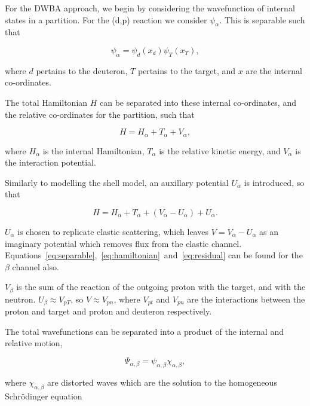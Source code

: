For the DWBA approach, we begin by considering the wavefunction of internal states in a partition. For the (d,p) reaction we consider $\psi_\alpha$. This is separable such that

\begin{equation} \label{eq:separable}
\psi_\alpha = \psi_d(x_d) \psi_T(x_T)\mathrm{,}
\end{equation}

where $d$ pertains to the deuteron, $T$ pertains to the target, and $x$ are the internal co-ordinates.

The total Hamiltonian $H$ can be separated into these internal co-ordinates, and the relative co-ordinates for the partition, such that

\begin{equation} \label{eq:hamiltonian}
H = H_\alpha + T_\alpha + V_\alpha\mathrm{,}
\end{equation}

where $H_\alpha$ is the internal Hamiltonian, $T_\alpha$ is the relative kinetic energy, and $V_\alpha$ is the interaction potential. 

Similarly to modelling the shell model, an auxillary potential $U_\alpha$ is introduced, so that

\begin{equation} \label{eq:residual}
H = H_\alpha + T_\alpha + (V_\alpha - U_\alpha) + U_\alpha \mathrm{.}
\end{equation}

$U_\alpha$ is chosen to replicate elastic scattering, which leaves $V = V_\alpha - U_\alpha$ as an imaginary potential which removes flux from the elastic channel. Equations~\ref{eq:separable},~\ref{eq:hamiltonian}~and~\ref{eq:residual} can be found for the $\beta$ channel also.

$V_\beta$ is the sum of the reaction of the outgoing proton with the target, and with the neutron. $U_\beta \approx V_{pT}$, so $V \approx V_{pn}$, where $V_{pt}$ and $V_{pn}$ are the interactions between the proton and target and proton and deuteron respectively.

The total wavefunctions can be separated into a product of the internal and relative motion,

\begin{equation}
\Psi_{\alpha,\beta} = \psi_{\alpha,\beta}\chi_{\alpha,\beta}\mathrm{,}
\end{equation}

where $\chi_{\alpha,\beta}$ are distorted waves which are the solution to the homogeneous Schr{\"o}dinger equation

